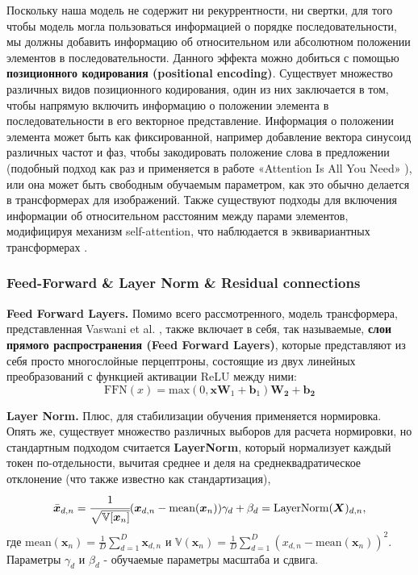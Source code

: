 Поскольку наша модель не содержит ни рекуррентности, ни свертки, для того чтобы 
модель могла пользоваться информацией о порядке последовательности, мы должны 
добавить информацию об относительном или абсолютном положении элементов 
в последовательности. Данного эффекта можно добиться с помощью \textbf{позиционного 
кодирования (positional encoding)}. Существует множество различных видов 
позиционного кодирования, один из них заключается в том, чтобы напрямую включить 
информацию о положении элемента в последовательности в его векторное представление. 
Информация о положении элемента может быть как фиксированной, например 
добавление вектора синусоид различных частот и фаз, чтобы закодировать положение 
слова в предложении (подобный подход как раз и применяется в работе «Attention Is All You Need» 
\cite{vaswani2017attention}), или она может быть свободным обучаемым параметром, 
как это обычно делается в трансформерах для изображений. Также существуют подходы для 
включения информации об относительном расстояним между парами элементов, модифицируя 
механизм self-attention, что наблюдается в эквивариантных трансформерах \cite{turner_transformers_intro}.

\subsubsection{Feed-Forward \& Layer Norm \& Residual connections}

\textbf{Feed Forward Layers. \quad}
Помимо всего рассмотренного, модель трансформера, представленная 
Vaswani et al. \cite{vaswani2017attention}, также включает в себя, так 
называемые, \textbf{слои прямого распространения (Feed Forward Layers)}, которые 
представляют из себя просто многослойные перцептроны, 
состоящие из двух линейных преобразований с функцией активации ReLU между ними:
\begin{equation*}
    \text{FFN}(x) = \text{max}(0, \bm{x}\bm{W}_1 + \bm{b}_1)\bm{W_2} + \bm{b_2}
\end{equation*}

\textbf{Layer Norm. \quad}
Плюс, для стабилизации обучения применяется нормировка. Опять же, существует 
множество различных выборов для расчета нормировки, но стандартным подходом считается 
\textbf{LayerNorm}, который нормализует каждый токен по-отдельности, вычитая среднее и 
деля на среднеквадратическое отклонение (что также известно как стандартизация),
\begin{equation*}
    \bar{\bm{x}}_{d,n} = \cfrac{1}{\sqrt{\mathbb{V}[\bm{x}_n]}} 
    (\bm{x}_{d,n} - \text{mean}(\bm{x}_n)) 
    \gamma_d + \beta_d = \text{LayerNorm}(\bm{X})_{d, n},
\end{equation*}
где $\text{mean}(\bm{x}_n) = \frac{1}{D} \sum_{d=1}^D \bm{x}_{d,n}$ и 
$\mathbb{V}(\bm{x}_n) = \frac{1}{D} \sum_{d=1}^D (x_{d,n} - \text{mean}(\bm{x}_n))^2$. 
Параметры $\gamma_d$ и $\beta_d$ - обучаемые параметры масштаба и сдвига.


